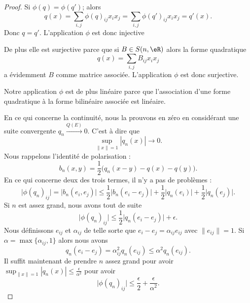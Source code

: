 \begin{proof}
    Si \( \phi(q)=\phi(q')\); alors
    \begin{equation}
        q(x)=\sum_{i,j}\phi(q)_{ij}x_ix_j=\sum_{i,j}\phi(q')_{ij}x_ix_j=q'(x).
    \end{equation}
    Donc \( q=q'\). L'application \( \phi\) est donc injective

    De plus elle est surjective parce que si \( B\in S(n,\eR)\) alors la forme quadratique
    \begin{equation}
        q(x)=\sum_{i,j}B_{ij}x_ix_j
    \end{equation}
    a évidemment \( B\) comme matrice associée. L'application \( \phi\) est donc surjective.

    Notre application \( \phi\) est de plus linéaire parce que l'association d'une forme quadratique à la forme bilinéaire associée est linéaire.

    En ce qui concerne la continuité, nous la prouvons en zéro en considérant une suite convergente \( q_n\stackrel{Q(E)}{\longrightarrow}0\). C'est à dire que
    \begin{equation}
        \sup_{\| x \|=1}| q_n(x) |\to 0.
    \end{equation}
    Nous rappelons l'identité de polarisation : 
    \begin{equation}
        b_n(x,y)=\frac{ 1 }{2}\big( q_n(x-y)-q(x)-q(y) \big).
    \end{equation}
    En ce qui concerne deux des trois termes, il n'y a pas de problèmes :
    \begin{equation}
        \big| \phi(q_n)_{ij} \big|=\big| b_n(e_i,e_j) \big|\leq\frac{ 1 }{2}\big| b_n(e_i-e_j) \big|+\frac{ 1 }{2}\big| q_n(e_i) \big|+\frac{ 1 }{2}\big| q_n(e_j) \big|.
    \end{equation}
    Si \( n\) est assez grand, nous avons tout de suite
    \begin{equation}
        \big| \phi(q_n)_{ij} \big|\leq \frac{ 1 }{2}\big| q_n(e_i-e_j) \big|+\epsilon.
    \end{equation}
    Nous définissons \( e_{ij}\) et \( \alpha_{ij}\) de telle sorte que \( e_i-e_j=\alpha_{ij}e_{ij}\) avec \( \| e_{ij} \|=1\). Si \( \alpha=\max\{ \alpha_{ij},1 \}\) alors nous avons
    \begin{equation}
        q_n(e_i-e_j)=\alpha_{ij}^2q_n(e_{ij})\leq \alpha^2q_n(e_{ij}).
    \end{equation}
    Il suffit maintenant de prendre \( n\) assez grand pour avoir \( \sup_{\| x \|=1}| q_n(x) |\leq \frac{ \epsilon }{ \alpha^2 }\) pour avoir
    \begin{equation}
        \big| \phi(q_n)_{ij} \big|\leq \frac{ \epsilon }{2}+\frac{ \epsilon }{ \alpha^2 }.
    \end{equation}
\end{proof}

